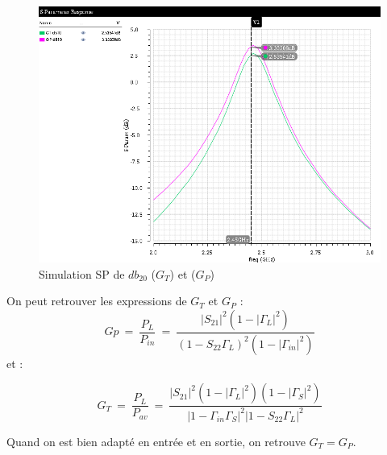 \documentclass[a4paper]{article}
\begin{document}
\begin{figure}[!htb]
\begin{center}
  \includegraphics[scale=0.45]{Q4-GT-GP-db20.png}
  \caption{Simulation SP de $db_{20}$ ($G_T$) et ($G_P$) }
  \label{sim-GT-GP}
\end{center}
\end{figure}

\clearpage

On peut retrouver les expressions de $G_T$ et $G_P$ :
\begin{equation*}
Gp\ =\ \frac{P_{L}}{P_{in}} \ =\ \frac{|S_{21} |^{2}\left( 1-|\Gamma _{L} |^{2}\right)}{( 1-S_{22} \Gamma _{L})^{2}\left( 1-|\Gamma _{in} |^{2}\right)}
\end{equation*}
et :

\begin{equation*}
  G_{T} \ =\ \frac{P_{L}}{P_{av}} \ =\ \frac{|S_{21} |^{2}\left( 1-|\Gamma _{L} |^{2}\right)\left( 1-|\Gamma _{S} |^{2}\right)}{|1-\Gamma _{in} \Gamma _{S} |^{2} |1-S_{22} \Gamma _{L} |^{2}}
\end{equation*}

Quand on est bien adapt\'e en entr\'ee et en sortie, on retrouve $G_T = G_P$.
\end{document}

